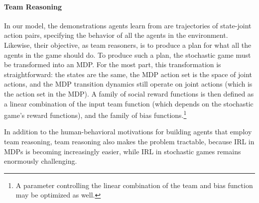 
\vspace{\up}
\paragraph{Team Reasoning}

In our model, the demonstrations agents learn from are trajectories of
state-joint action pairs, specifying the behavior of all the agents in
the environment.  Likewise, their objective, as team reasoners, is to
produce a plan for what all the agents in the game should do.  To
produce such a plan, the stochastic game must be transformed into an
MDP.  For the most part, this transformation is straightforward: the
states are the same, the MDP action set is the space of joint actions,
and the MDP transition dynamics still operate on joint actions (which
is the action set in the MDP).  A family of social reward functions is
then defined as a linear combination of the input team function (which
depends on the stochastic game's reward functions), and the family of
bias functions.\footnote{A parameter controlling the linear
  combination of the team and bias function may be optimized as well.}

In addition to the human-behavioral motivations for building agents
that employ team reasoning, team reasoning also makes the problem
tractable, because IRL in MDPs is becoming increasingly easier, while
IRL in stochastic games remains enormously challenging.


